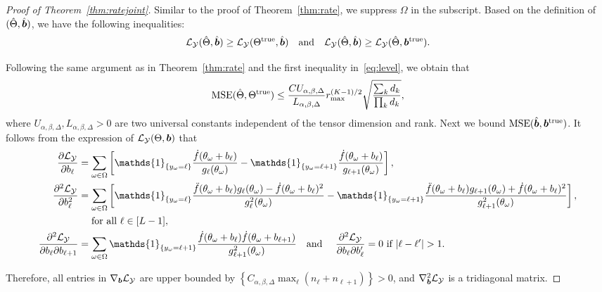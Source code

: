 \documentclass[11pt]{article}
\theoremstyle{plain}
\theoremstyle{definition}
\begin{document}
\begin{proof}[Proof of Theorem~\ref{thm:ratejoint}]
Similar to the proof of Theorem~\ref{thm:rate}, we suppress $\Omega$ in the subscript. Based on the definition of $(\hat \Theta, \hat {\bm{b}})$, 
we have the following inequalities:
\begin{equation}\label{eq:level}
\mathcal{L}_{\mathcal{Y}}(\hat \Theta,\hat {\bm{b}})\geq \mathcal{L}_{\mathcal{Y}}(\Theta^{\text{true}},\hat {\bm{b}})\quad \text{and}\quad \mathcal{L}_{\mathcal{Y}}(\hat \Theta,\hat {\bm{b}})\geq \mathcal{L}_{\mathcal{Y}}(\hat \Theta, \bm{b}^{\text{true}}).
\end{equation}

Following the same argument as in Theorem~\ref{thm:rate} and the first inequality in~\eqref{eq:level}, we obtain that
\begin{equation}\label{eq:ratenew}
\text{MSE}(\hat \Theta, \Theta^{\text{true}})\leq {CU_{\alpha,\beta,\Delta}\over L_{\alpha,\beta,\Delta}} r_{\max}^{(K-1)/2}  \sqrt{ \sum_k d_k \over \prod_k d_k},
\end{equation}
where $U_{\alpha,\beta,\Delta}, L_{\alpha,\beta,\Delta}>0$ are two universal constants independent of the tensor dimension and rank.
Next we bound $\text{MSE}(\hat {\bm{b}},\bm{b}^{\text{true}})$. It follows from the expression of $\mathcal{L}_{\mathcal{Y}}(\Theta,\bm{b})$ that
\begin{align}\label{eq:property}
{\partial \flogl\over \partial b_\ell}&=\sum_{\omega\in\Omega}\left[\mathds{1}_{\{y_{\omega}=\ell\}}
\frac{\dot{f}(\theta_\omega+b_\ell)}{g_\ell(\theta_\omega)}-\mathds{1}_{\{y_{\omega}=\ell+1\}}
\frac{\dot{f}(\theta_\omega+b_\ell)}{g_{\ell+1}(\theta_\omega)}\right],\notag\\
{\partial^2 \flogl\over \partial b_\ell^2}&=\sum_{\omega\in\Omega}\left[\mathds{1}_{\{y_\omega=\ell\}}\frac{\ddot{f}(\theta_\omega+b_\ell)g_\ell(\theta_\omega)-\dot{f}(\theta_\omega+b_\ell)^2}{g^2_\ell(\theta_\omega)}-\mathds{1}_{\{y_\omega=\ell+1\}}\frac{\ddot{f}(\theta_\omega+b_\ell)g_{\ell+1}(\theta_\omega)+\dot{f}(\theta_\omega+b_\ell)^2}{g^2_{\ell+1}(\theta_\omega)}\right],\notag\\
&\quad  \text{ for all } \ell \in [L-1],\notag \\
{\partial^2 \flogl\over \partial b_\ell \partial b_{\ell+1}}&=\sum_{\omega\in\Omega}\mathds{1}_{\{y_\omega=\ell+1\}}\frac{\dot{f}(\theta_\omega+b_\ell)\dot{f}(\theta_\omega+b_{\ell+1})}{g^2_{\ell+1}(\theta_\omega)}\quad \text{and}\quad 
\ {\partial^2 \flogl\over \partial b_\ell \partial b_\ell'} = 0 \text{ if } |\ell-\ell'|>1.
\end{align}

Therefore, all entries in $\nabla_{\bm{b}}\mathcal{L}_{\mathcal{Y}}$ are upper bounded by $\left\{C_{\alpha,\beta,\Delta} \max_\ell (n_\ell+n_{\ell+1})\right\}>0$, and $\nabla^2_{\bm{b}}\mathcal{L}_{\mathcal{Y}}$ is a tridiagonal matrix.


\end{proof}
\end{document}
